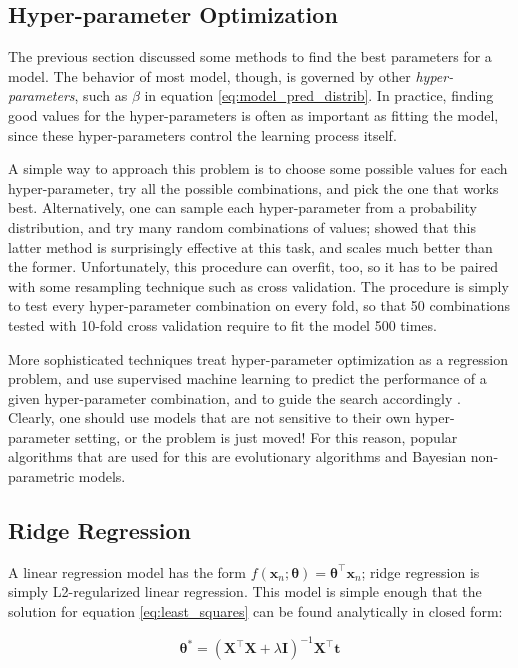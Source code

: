 \documentclass[a4paper]{book}
\begin{document}
\subsection{Hyper-parameter Optimization}
The previous section discussed some methods to find the best parameters for a model. The behavior of most model, though, is governed by other \emph{hyper-parameters}, such as $\beta$ in equation \ref{eq:model_pred_distrib}. In practice, finding good values for the hyper-parameters is often as important as fitting the model, since these hyper-parameters control the learning process itself.

A simple way to approach this problem is to choose some possible values for each hyper-parameter, try all the possible combinations, and pick the one that works best. Alternatively, one can sample each hyper-parameter from a probability distribution, and try many random combinations of values; \cite{random_search} showed that this latter method is surprisingly effective at this task, and scales much better than the former. Unfortunately, this procedure can overfit, too, so it has to be paired with some resampling technique such as cross validation. The procedure is simply to test every hyper-parameter combination on every fold, so that 50 combinations tested with 10-fold cross validation require to fit the model 500 times.

More sophisticated techniques treat hyper-parameter optimization as a regression problem, and use supervised machine learning to predict the performance of a given hyper-parameter combination, and to guide the search accordingly \citep{hyperopt}. Clearly, one should use models that are not sensitive to their own hyper-parameter setting, or the problem is just moved! For this reason, popular algorithms that are used for this are evolutionary algorithms and Bayesian non-parametric models.

\subsection{Ridge Regression}
\label{sec:ridge}
A linear regression model has the form $f(\bm x_n;\bm\theta)=\bm\theta^\intercal\bm x_n$; ridge regression is simply L2-regularized linear regression. This model is simple enough that the solution for equation \ref{eq:least_squares} can be found analytically in closed form:

\begin{equation}
\label{eq:ridge_solution}
\bm\theta^*=(\bm X^\intercal\bm X+\lambda\bm I)^{-1}\bm X^\intercal\bm t
\end{equation}
\end{document}
